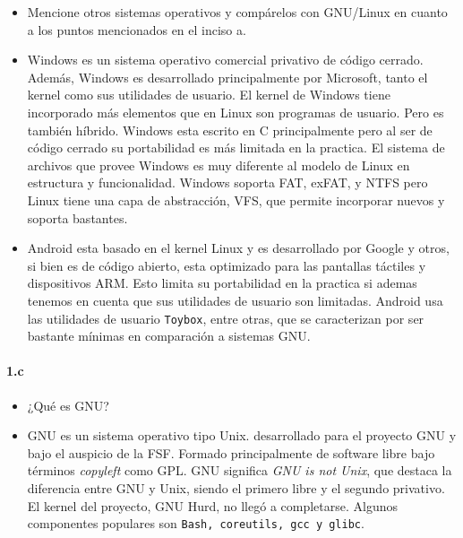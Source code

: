 \documentclass[10pt,a4paper]{paper}
\begin{document}
	\begin{itemize}
		\item Mencione otros sistemas operativos y compárelos con GNU/Linux en cuanto a
		los puntos mencionados en el inciso a.
		
		\item Windows es un sistema operativo comercial privativo de código cerrado.
		Además, Windows es desarrollado principalmente por Microsoft, tanto el kernel
		como sus utilidades de usuario. El kernel de Windows tiene incorporado más
		elementos que en Linux son programas de usuario. Pero es también híbrido.
		Windows esta escrito en C principalmente pero al ser de código cerrado su
		portabilidad es más limitada en la practica. El sistema de archivos que provee
		Windows es muy diferente al modelo de Linux en estructura y funcionalidad.
		Windows soporta FAT, exFAT, y NTFS pero Linux tiene una capa de abstracción,
		VFS, que permite incorporar nuevos y soporta bastantes.
		
		\item Android esta basado en el kernel Linux y es desarrollado por Google y
		otros, si bien es de código abierto, esta optimizado para las pantallas táctiles
		y dispositivos ARM. Esto limita su portabilidad en la practica si ademas tenemos
		en cuenta que sus utilidades de usuario son limitadas. Android usa las
		utilidades de usuario \texttt{Toybox}, entre otras, que se caracterizan por ser
		bastante mínimas en comparación a sistemas GNU.
	\end{itemize}
	
	
	
	
	\paragraph{1.c}
	
	\begin{itemize}
		\item ¿Qué es GNU?
		
		\item GNU es un sistema operativo tipo Unix. desarrollado para el proyecto GNU
		y bajo el auspicio de la FSF. Formado principalmente de software libre bajo
		términos \textit{copyleft} como GPL. GNU significa \textit{GNU is not Unix}, que
		destaca la diferencia entre GNU y Unix, siendo el primero libre y el segundo
		privativo. El kernel del proyecto, GNU Hurd, no llegó a completarse. Algunos
		componentes populares son \texttt{Bash, coreutils, gcc y glibc}.
	\end{itemize}
	
\end{document}
